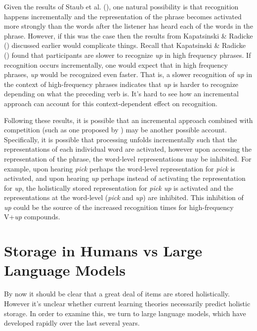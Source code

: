 \documentclass[
  12pt,
  letterpaper,
]{scrreprt}
\begin{document}
Given the results of Staub et al.
(), one natural
possibility is that recognition happens incrementally and the
representation of the phrase becomes activated more strongly than the
words after the listener has heard each of the words in the phrase.
However, if this was the case then the results from Kapatsinski \&
Radicke ()
discussed earlier would complicate things. Recall that Kapatsinski \&
Radicke ()
found that participants are slower to recognize \emph{up} in high
frequency phrases. If recognition occurs incrementally, one would expect
that in high frequency phrases, \emph{up} would be recognized even
faster. That is, a slower recognition of \emph{up} in the context of
high-frequency phrases indicates that \emph{up} is harder to recognize
depending on what the preceding verb is. It's hard to see how an
incremental approach can account for this context-dependent effect on
recognition.

Following these results, it is possible that an incremental approach
combined with competition (such as one proposed by
)
may be another possible account. Specifically, it is possible that
processing unfolds incrementally such that the representations of each
individual word are activated, however upon accessing the representation
of the phrase, the word-level representations may be inhibited. For
example, upon hearing \emph{pick} perhaps the word-level representation
for \emph{pick} is activated, and upon hearing \emph{up} perhaps instead
of activating the representation for \emph{up}, the holistically stored
representation for \emph{pick up} is activated and the representations
at the word-level (\emph{pick} and \emph{up}) are inhibited. This
inhibition of \emph{up} could be the source of the increased recognition
times for high-frequency V+\emph{up} compounds.

\section{Storage in Humans vs Large Language
Models}\label{sec-storage-in-humans-vs-large-language-models}

By now it should be clear that a great deal of items are stored
holistically. However it's unclear whether current learning theories
necessarily predict holistic storage. In order to examine this, we turn
to large language models, which have developed rapidly over the last
several years.
\end{document}
